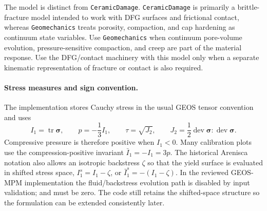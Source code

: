 The model is distinct from \texttt{CeramicDamage}.  \texttt{CeramicDamage} is primarily a brittle-fracture model intended to work with DFG surfaces and frictional contact, whereas \texttt{Geomechanics} treats porosity, compaction, and cap hardening as continuum state variables.  Use \texttt{Geomechanics} when continuum pore-volume evolution, pressure-sensitive compaction, and creep are part of the material response.  Use the DFG/contact machinery with this model only when a separate kinematic representation of fracture or contact is also required.

\paragraph{Stress measures and sign convention.}
The implementation stores Cauchy stress in the usual GEOS tensor convention and uses
\begin{equation}
  I_1 = \operatorname{tr}\boldsymbol{\sigma}, \qquad
  p = -\frac{1}{3}I_1, \qquad
  \tau = \sqrt{J_2}, \qquad
  J_2 = \frac{1}{2}\operatorname{dev}\boldsymbol{\sigma}:\operatorname{dev}\boldsymbol{\sigma}.
  \label{eq:geomechanics-invariants}
\end{equation}
Compressive pressure is therefore positive when \(I_1<0\).  Many calibration plots use the compression-positive invariant \(\bar I_1=-I_1=3p\).  The historical Arenisca notation also allows an isotropic backstress \(\zeta\) so that the yield surface is evaluated in shifted stress space, \(I_1^s=I_1-\zeta\), or \(\bar I_1^s=-(I_1-\zeta)\).  In the reviewed GEOS-MPM implementation the fluid/backstress evolution path is disabled by input validation;  and  must be zero.  The code still retains the shifted-space structure so the formulation can be extended consistently later.

